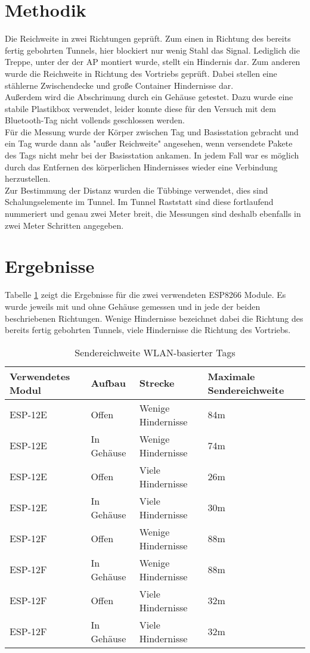\section{Methodik}
Die Reichweite in zwei Richtungen geprüft.
Zum einen in Richtung des bereits fertig gebohrten Tunnels, hier blockiert nur wenig Stahl das Signal. 
Lediglich die Treppe, unter der der AP montiert wurde, stellt ein Hindernis dar.
Zum anderen wurde die Reichweite in Richtung des Vortriebs geprüft.
Dabei stellen eine stählerne Zwischendecke und große Container Hindernisse dar.\\
Außerdem wird die Abschrimung durch ein Gehäuse getestet.
Dazu wurde eine stabile Plastikbox verwendet, leider konnte diese für den Versuch mit dem Bluetooth-Tag nicht vollends geschlossen werden.\\
Für die Messung wurde der Körper zwischen Tag und Basisstation gebracht und ein Tag wurde dann als "außer Reichweite" angesehen, wenn versendete Pakete des Tags nicht mehr bei der Basisstation ankamen.
In jedem Fall war es möglich durch das Entfernen des körperlichen Hindernisses wieder eine Verbindung herzustellen.\\
Zur Bestimmung der Distanz wurden die Tübbinge verwendet, dies sind Schalungselemente im Tunnel.
Im Tunnel Raststatt sind diese fortlaufend nummeriert und genau zwei Meter breit, die Messungen sind deshalb ebenfalls in zwei Meter Schritten angegeben.

\section{Ergebnisse}
Tabelle \ref{table:rangewifi} zeigt die Ergebnisse für die zwei verwendeten ESP8266 Module.
Es wurde jeweils mit und ohne Gehäuse gemessen und in jede der beiden beschriebenen Richtungen.
Wenige Hindernisse bezeichnet dabei die Richtung des bereits fertig gebohrten Tunnels, viele Hindernisse die Richtung des Vortriebs.

\begin{table}[h]
	\centering
	\caption{Sendereichweite WLAN-basierter Tags}
	\label{table:rangewifi}
	\begin{tabular}{p{3.5cm}|p{3cm}|p{3.5cm}|p{3cm}}
		Verwendetes Modul & Aufbau & Strecke & Maximale Sendereichweite \\
		\hline
		ESP-12E & Offen & Wenige Hindernisse & 84m \\
		ESP-12E & In Gehäuse & Wenige Hindernisse & 74m \\
		ESP-12E & Offen & Viele Hindernisse & 26m \\
		ESP-12E & In Gehäuse & Viele Hindernisse & 30m \\
		\hline
		ESP-12F & Offen & Wenige Hindernisse & 88m \\
		ESP-12F & In Gehäuse & Wenige Hindernisse & 88m \\
		ESP-12F & Offen & Viele Hindernisse & 32m \\
		ESP-12F & In Gehäuse & Viele Hindernisse & 32m \\
	\end{tabular}
\end{table}

